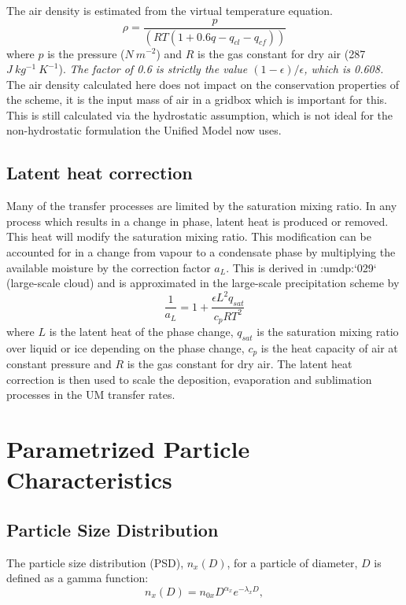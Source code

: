 \documentclass{UMDP_article}
\newcommand{\citeumdp}[1]{:umdp:`#1`}
\def\bq{\begin{equation}}
\def\eq{\end{equation}}
\begin{document}
The air density is estimated from the virtual temperature equation.
\bq
\rho = \frac{p}{\left( R T \left( 1 + 0.6 q - q_{cl} - q_{cf} \right) \right)}
\eq
where $p$ is the pressure ($N~m^{-2}$) and $R$ is the gas constant for dry air
(287 $J~kg^{-1}~K^{-1}$). \textit{The factor of 0.6 is strictly the value
 $(1-\epsilon)/\epsilon$, which is 0.608.} The air density calculated here does
not impact on the conservation properties of the scheme, it is the input mass of
air in a gridbox which is important for this. This is still calculated via the
hydrostatic assumption, which is not ideal for the non-hydrostatic formulation
the Unified Model now uses.

\subsection{Latent heat correction}

Many of the transfer processes are limited by the saturation mixing ratio. In
any process which results in a change in phase, latent heat is produced or removed.
This heat will modify the saturation mixing ratio. This modification can be 
accounted for in a change from vapour to a condensate phase by multiplying the 
available moisture by the correction factor $a_L$. This is derived in \citeumdp{029} (large-scale cloud) and is approximated in the 
large-scale precipitation scheme by
\bq
\frac{1}{a_L} = 1 +  \frac{\epsilon L^2 q_{sat}}{c_p R T^{2}}
\eq
where $L$ is the latent heat of the phase change, $q_{sat}$ is the saturation mixing 
ratio over liquid or ice depending on the phase change, $c_p$ is the heat capacity 
of air at constant pressure and $R$ is the gas constant for dry air. The latent heat 
correction is then used to scale the deposition, evaporation and sublimation processes 
in the UM transfer rates.

\newpage

\section{Parametrized Particle Characteristics}
\label{sec:param_par_char}

\subsection{Particle Size Distribution}
The particle size distribution (PSD), $n_x(D)$, for a particle of diameter, $D$ is 
defined as a gamma function:
\bq
  n_x(D)=n_{0x} D^{\alpha_x} e^{-\lambda_x D},
\label{eq:mic_nx}
\eq
\end{document}
